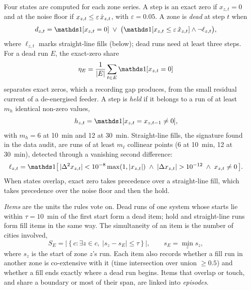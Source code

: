 Four states are computed for each zone series. A step is an exact zero if $x_{z,t} = 0$ and at the noise floor if $x_{z,t} \leq \varepsilon\, \hat{x}_{z,t}$, with $\varepsilon = 0.05$. A zone is \emph{dead} at step $t$ when
\begin{equation}
d_{z,t} = \one[x_{z,t} = 0] \;\lor\; \big(\one[x_{z,t} \leq \varepsilon\, \xh_{z,t}] \land \lnot \ell_{z,t}\big),
\label{eq:dead}
\end{equation}
where $\ell_{z,t}$ marks straight-line fills (below); dead runs need at least three steps. For a dead run $E$, the exact-zero share
\begin{equation}
\eta_E = \frac{1}{|E|} \sum_{t \in E} \one[x_{z,t} = 0]
\label{eq:eta}
\end{equation}
separates exact zeros, which a recording gap produces, from the small residual current of a de-energised feeder. A step is \emph{held} if it belongs to a run of at least $m_h$ identical non-zero values,
\begin{equation}
h_{z,t} = \one[x_{z,t} = x_{z,t-1} \neq 0],
\label{eq:hold}
\end{equation}
with $m_h = 6$ at 10~min and 12 at 30~min. Straight-line fills, the signature found in the data audit, are runs of at least $m_\ell$ collinear points (6 at 10~min, 12 at 30~min), detected through a vanishing second difference:
\begin{equation}
\ell_{z,t} = \one\big[\, |\Delta^2 x_{z,t}| < 10^{-8} \max(1, |x_{z,t}|) \;\land\; |\Delta x_{z,t}| > 10^{-12} \;\land\; x_{z,t} \neq 0 \,\big].
\label{eq:linear}
\end{equation}
When states overlap, exact zero takes precedence over a straight-line fill, which takes precedence over the noise floor and then the hold.

\emph{Items} are the units the rules vote on. Dead runs of one system whose starts lie within $\tau = 10$~min of the first start form a dead item; hold and straight-line runs form fill items in the same way. The simultaneity of an item is the number of cities involved,
\begin{equation}
S_E = \left| \left\{ c : \exists z \in c,\; |s_{z} - s_E| \leq \tau \right\} \right|, \qquad s_E = \min_{z} s_{z},
\label{eq:simultaneity}
\end{equation}
where $s_z$ is the start of zone $z$'s run. Each item also records whether a fill run in another zone is co-extensive with it (time intersection over union $\geq 0.5$) and whether a fill ends exactly where a dead run begins. Items that overlap or touch, and share a boundary or most of their span, are linked into \emph{episodes}.

